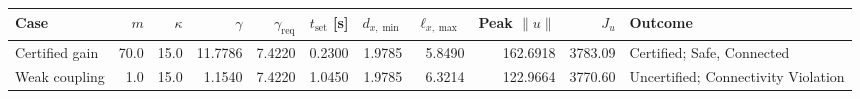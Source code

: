 \begin{tabular}{@{}lrrrrrrrrrl@{}}\toprule
Case & $m$ & $\kappa$ & $\gamma$ & $\gamma_{\mathrm{req}}$ & $t_{\mathrm{set}}$ [s] & $d_{x,\min}$ & $\ell_{x,\max}$ & Peak $\|u\|$ & $J_u$ & Outcome \\\midrule
Certified gain & 70.0 & 15.0 & 11.7786 & 7.4220 & 0.2300 & 1.9785 & 5.8490 & 162.6918 & 3783.09 & Certified; Safe, Connected \\
Weak coupling & 1.0 & 15.0 & 1.1540 & 7.4220 & 1.0450 & 1.9785 & 6.3214 & 122.9664 & 3770.60 & Uncertified; Connectivity Violation \\
\bottomrule\end{tabular}
